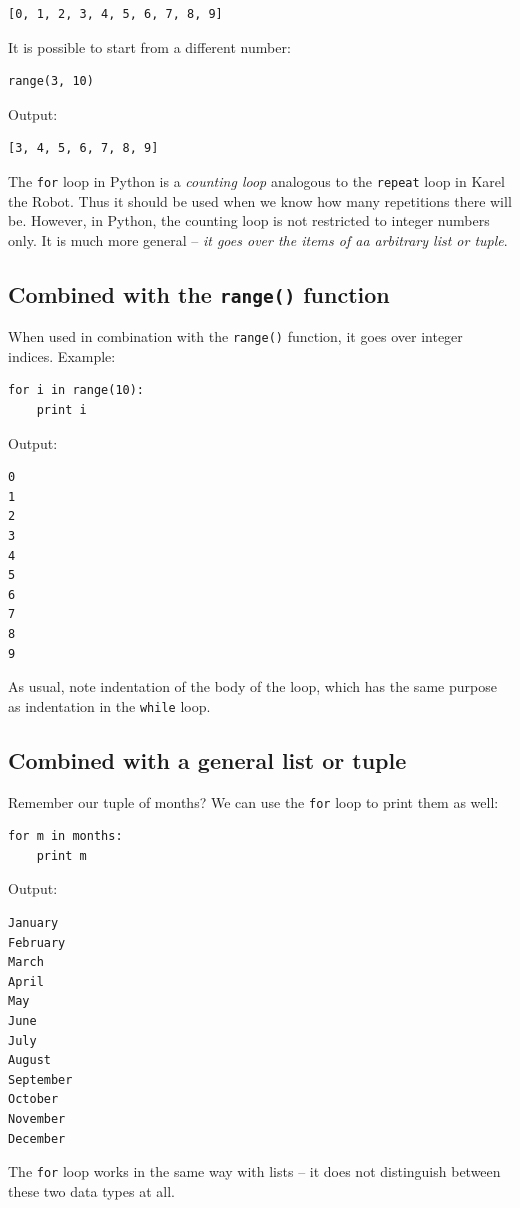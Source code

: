\begin{verbatim}
[0, 1, 2, 3, 4, 5, 6, 7, 8, 9]
\end{verbatim}
It is possible to start from a different number:

\begin{verbatim}
range(3, 10)
\end{verbatim}
Output:

\begin{verbatim}
[3, 4, 5, 6, 7, 8, 9]
\end{verbatim}
The {\tt for} loop in Python is a {\em counting loop} analogous to the {\tt repeat}
loop in Karel the Robot. Thus it should be used when we know how many repetitions there 
will be. However, in Python, the counting loop is not restricted to integer numbers 
only. It is much more general -- {\em it goes over the items of aa arbitrary list or tuple}. 

\subsection{Combined with the {\tt range()} function}

When used in combination with the {\tt range()} function, it goes over integer indices. 
Example:

\begin{verbatim}
for i in range(10):
    print i
\end{verbatim}
Output:

\begin{verbatim}
0
1
2
3
4
5
6
7
8
9
\end{verbatim}
As usual, note indentation of the body of the loop, which has the same 
purpose as indentation in the {\tt while} loop. 

\subsection{Combined with a general list or tuple}

Remember our tuple of months? We can use the {\tt for} loop to print them as well:

\begin{verbatim}
for m in months:
    print m
\end{verbatim}
Output:

\begin{verbatim}
January
February
March
April
May
June
July
August
September
October
November
December
\end{verbatim}
The {\tt for} loop works in the same way with lists -- it does not distinguish between these 
two data types at all.

